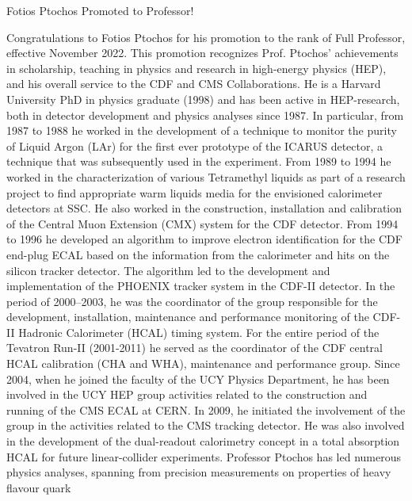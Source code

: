 \begin{headline}[enhanced, tikz={rotate=0}]{Fotios Ptochos Promoted to Professor!}
  \begin{multicols}{2}
    Congratulations to Fotios Ptochos for his promotion to the rank of
    Full Professor, effective November 2022. This promotion recognizes
    Prof. Ptochos' achievements in scholarship, teaching in physics and research in
    high-energy physics (HEP), and his overall service to the CDF and CMS
    Collaborations. He is a Harvard University PhD in physics
    graduate (1998) and has been active in HEP-research, both in detector
    development and physics analyses since 1987. In particular, from 1987
    to 1988 he worked in the development of a technique to monitor the
    purity of Liquid Argon (LAr) for the first ever prototype of the
    ICARUS detector, a technique that was subsequently used in the
    experiment. From 1989 to 1994 he worked in the characterization of
    various Tetramethyl liquids as part of a research project to find
    appropriate warm liquids media for the envisioned calorimeter
    detectors at SSC. He also worked in the construction, installation and
    calibration of the Central Muon Extension (CMX) system for the CDF
    detector. From 1994 to 1996 he developed an algorithm to improve
    electron identification for the CDF end-plug ECAL based on the
    information from the calorimeter and hits on the silicon tracker
    detector. The algorithm led to the development and implementation of
    the PHOENIX tracker system in the CDF-II detector. 
    In the period of 2000–2003, he was the coordinator of the group
    responsible for the development, installation, maintenance and
    performance monitoring of the CDF-II Hadronic Calorimeter (HCAL)
    timing system. For the entire period of the Tevatron Run-II
    (2001-2011) he served as the coordinator of the CDF central HCAL
    calibration (CHA and WHA), maintenance and performance group. Since
    2004, when he joined the faculty of the UCY Physics Department, he has
    been involved in the UCY HEP group activities related to the
    construction and running of the CMS ECAL at CERN. In 2009, he
    initiated the involvement of the group in the activities related to
    the CMS tracking detector. He was also involved in the development of
    the dual-readout calorimetry concept in a total absorption HCAL for
    future linear-collider experiments. 
    Professor Ptochos has led numerous physics analyses, spanning
    from precision measurements on properties of heavy flavour quark

\end{multicols}
\end{headline}
